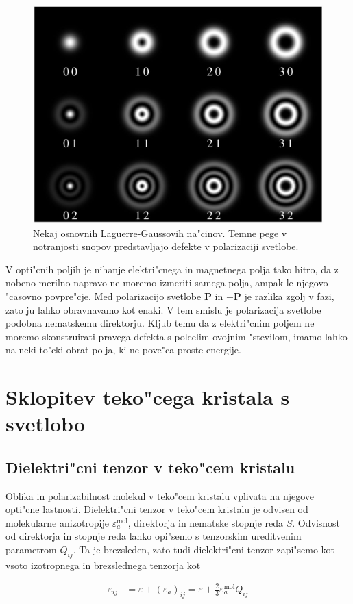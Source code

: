 \documentclass[a4paper,10pt]{article}
\renewcommand{\vec}{\mathbf}
\begin{document}
\begin{figure}[h]
 \centering
 \includegraphics[width=.6\textwidth]{./Slike/LG-wiki}
 \caption{Nekaj osnovnih Laguerre-Gaussovih na"cinov. Temne pege v notranjosti snopov predstavljajo defekte v polarizaciji svetlobe. \cite{lg-wiki}}
 \label{fig:laguerre-gauss}
\end{figure}


V opti"cnih poljih je nihanje elektri"cnega in magnetnega polja tako hitro, da z nobeno merilno napravo ne moremo izmeriti samega polja, ampak le njegovo "casovno povpre"cje. 
Med polarizacijo svetlobe $\vec P$ in $-\vec P$ je razlika zgolj v fazi, zato ju lahko obravnavamo kot enaki. 
V tem smislu je polarizacija svetlobe podobna nematskemu direktorju. 
Kljub temu da z elektri"cnim poljem ne moremo skonstruirati pravega defekta s polcelim ovojnim "stevilom, imamo lahko na neki to"cki obrat polja, ki ne pove"ca proste energije. 


\section{Sklopitev teko"cega kristala s svetlobo}

\subsection{Dielektri"cni tenzor v teko"cem kristalu}
\label{sec:dielektricnost}
Oblika in polarizabilnost molekul v teko"cem kristalu vplivata na njegove opti"cne lastnosti. 
Dielektri"cni tenzor v teko"cem kristalu je odvisen od molekularne anizotropije $\varepsilon_{a}^{\mathrm{mol}}$, direktorja in nematske stopnje reda $S$. 
Odvisnost od direktorja in stopnje reda lahko opi"semo s tenzorskim ureditvenim parametrom $Q_{ij}$. 
Ta je brezsleden, zato tudi dielektri"cni tenzor zapi"semo kot vsoto izotropnega in brezslednega tenzorja kot\cite{degennes, ravnik-zumer-ldg}

\begin{align}
\label{eq:dielektricni-tenzor}
 \varepsilon_{ij} &= \overline\varepsilon + (\varepsilon_a)_{ij} = \overline\varepsilon + \frac{2}{3}\varepsilon_a^{\mathrm{mol}} Q_{ij}
\end{align}
\end{document}
